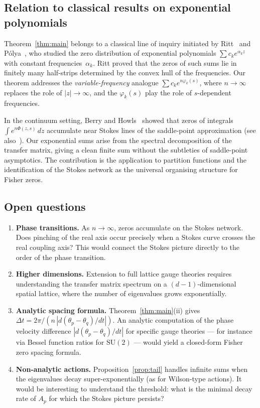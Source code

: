 \documentclass[12pt]{article}
\theoremstyle{definition}
\theoremstyle{remark}
\newcommand{\SU}{\mathrm{SU}}
\begin{document}
\subsection{Relation to classical results on exponential polynomials}

Theorem~\ref{thm:main} belongs to a classical line of inquiry
initiated by Ritt~\cite{Ritt1929} and
P\'olya~\cite{Polya1929}, who studied the zero distribution
of exponential polynomials $\sum c_k e^{\alpha_k z}$ with
constant frequencies~$\alpha_k$.  Ritt proved that the zeros
of such sums lie in finitely many half-strips determined by
the convex hull of the frequencies.  Our theorem addresses the
\emph{variable-frequency} analogue
$\sum c_k e^{n\varphi_k(s)}$, where $n \to \infty$ replaces
the role of $|z| \to \infty$, and the $\varphi_k(s)$ play the
role of $s$-dependent frequencies.

In the continuum setting, Berry and
Howls~\cite{BerryHowls1991} showed that zeros of integrals
$\int e^{n\Phi(z,s)}\,dz$ accumulate near Stokes lines of the
saddle-point approximation (see also~\cite{BenderOrszag,DingleBook}).  Our
exponential sums arise from the spectral decomposition of the
transfer matrix, giving a clean finite sum without the
subtleties of saddle-point asymptotics.  The contribution is
the application to partition functions and the identification
of the Stokes network as the universal organising structure
for Fisher zeros.

\subsection{Open questions}

\begin{enumerate}
\item \textbf{Phase transitions.}  As $n \to \infty$, zeros
  accumulate on the Stokes network.  Does pinching of the real axis
  occur precisely when a Stokes curve crosses the real coupling axis?
  This would connect the Stokes picture directly to the
  order of the phase transition.

\item \textbf{Higher dimensions.}  Extension to full lattice gauge
  theories requires understanding the transfer matrix spectrum on a
  $(d{-}1)$-dimensional spatial lattice, where the number of
  eigenvalues grows exponentially.

\item \textbf{Analytic spacing formula.}
  Theorem~\ref{thm:main}(ii) gives
  $\Delta t = 2\pi/(n\,|d(\theta_p - \theta_q)/dt|)$.
  An analytic computation of the phase velocity difference
  $|d(\theta_p - \theta_q)/dt|$ for specific gauge theories ---
  for instance via Bessel function ratios for $\SU(2)$ --- would
  yield a closed-form Fisher zero spacing formula.

\item \textbf{Non-analytic actions.}
  Proposition~\ref{prop:tail} handles infinite sums when the
  eigenvalues decay super-exponentially (as for Wilson-type actions).
  It would be interesting to understand the threshold: what is the
  minimal decay rate of $A_p$ for which the Stokes picture persists?
\end{enumerate}
\end{document}

